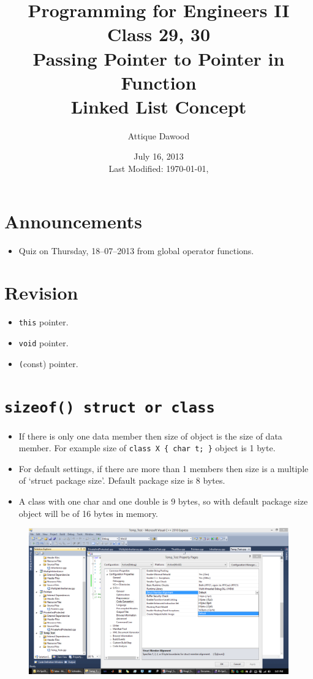 \documentclass[12pt,a4paper]{article}
\title{\vspace{-2cm}Programming for Engineers II\\Class 29, 30\\Passing Pointer to Pointer in Function\\Linked List Concept}
\author{Attique Dawood}
\date{July 16, 2013\\[0.2cm] Last Modified: \today, \currenttime}
\begin{document}
\maketitle
\section{Announcements}
\begin{itemize}
\item Quiz on Thursday, 18--07--2013 from global operator functions.
\end{itemize}
\section{Revision}
\begin{itemize}
\item \texttt{this} pointer.
\item \texttt{void} pointer.
\item \texttt(const) pointer.
\end{itemize}
\section{\texttt{sizeof() struct or class}}
\begin{itemize}
\item If there is only one data member then size of object is the size of data member. For example size of \verb|class X { char t; }| object is 1 byte.
\item For default settings, if there are more than 1 members then size is a multiple of `struct package size'. Default package size is 8 bytes.
\item A class with one char and one double is 9 bytes, so with default package size object will be of 16 bytes in memory.
\end{itemize}
\begin{figure}[H]
\includegraphics[width=\textwidth]{StructPackagingSize}
\end{figure}
\end{document}
